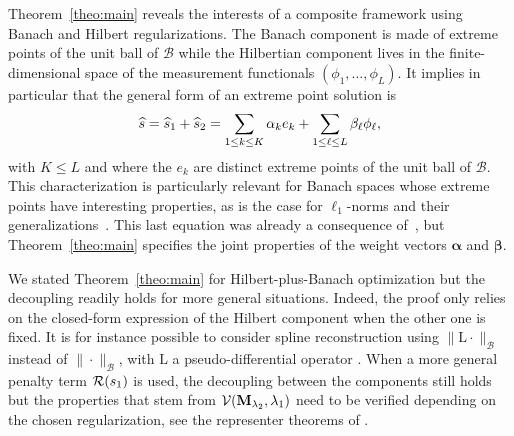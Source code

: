 \documentclass[12pt]{article}
\begin{document}
    Theorem~\ref{theo:main} reveals the interests of a composite framework using Banach and Hilbert regularizations. The Banach component is made of extreme points of the unit ball of $\mathcal{B}$
    while the Hilbertian component lives in the finite-dimensional space of the measurement functionals $(\phi_1, \ldots, \phi_L)$. It implies in particular that the general form of an extreme point solution is 
    \begin{equation*}
        \widehat{s} = \widehat{s}_1 + \widehat{s}_2 = \sum_{1 \leq k \leq K} \alpha_k e_k + \sum_{1 \leq \ell \leq L} \beta_\ell \phi_{\ell},
    \end{equation*}
    with $K\leq L$ and where the $e_k$ are distinct extreme points of the unit ball of $\mathcal{B}$. 
    This characterization is particularly relevant for Banach spaces whose extreme points have interesting properties, as is the case for $\ell_1$-norms and their generalizations~\cite{chandrasekaran2012convex}.
    This last equation was already a consequence of~\cite[Theorem 2]{unser2022convex}, but Theorem~\ref{theo:main} specifies the joint properties of the weight vectors $\bm{\alpha}$ and $\bm{\beta}$.

    \begin{remark}
        We stated Theorem~\ref{theo:main} for Hilbert-plus-Banach optimization but the decoupling readily holds for more general situations. Indeed, the proof only relies on the closed-form expression of the Hilbert component when the other one is fixed.
        It is for instance possible to consider spline reconstruction using $\|\mathrm{L}\cdot\|_\mathcal{B}$ instead of $\|\cdot\|_\mathcal{B}$, with $\mathrm{L}$ a pseudo-differential operator \cite{unser2017splines}.
        When a more general penalty term $\mathcal{R}(s_1)$ is used, the decoupling between the components still holds but the properties that stem from $\mathcal{V}(\mathbf{M}_{\lambda_{2}}, \lambda_{1})$ need to be verified depending on the chosen regularization, see the representer theorems of \cite{boyer2019representer}.

    \end{remark}
\end{document}
